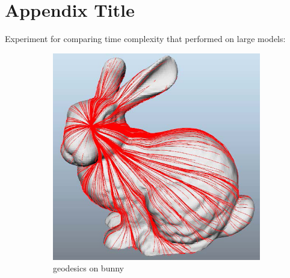 
\appendix

\chapter{Appendix Title}
\label{sec:appendix1}

Experiment for comparing time complexity that performed on large models:
\begin{figure}[H]
        \centering

        \begin{subfigure}[b]{0.5\textwidth}
                \includegraphics[width=\textwidth]{../images/geodesic_image/bunny}
                \caption{geodesics on bunny}
                \label{fig:bunny}
        \end{subfigure}%
        ~ %
        \begin{subfigure}[b]{0.5\textwidth}

\end{subfigure}
\end{figure}
